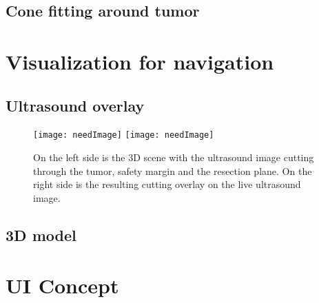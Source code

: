\subsection{Cone fitting around tumor}
\section{Visualization for navigation}
\subsection{Ultrasound overlay}

\begin{figure}[H]
  \centering
  \texttt{[image: needImage]} %
  \endminipage
  \hfill
  \texttt{[image: needImage]} %
  \endminipage
  \hfill 
 \caption{On the left side is the 3D scene with the ultrasound image cutting
   through the tumor, safety margin and the resection plane. On the right side
   is the resulting cutting overlay on the live ultrasound image.}
  \label{fig:cutterExample}
\end{figure}
\subsection{3D model}
\section{UI Concept}
